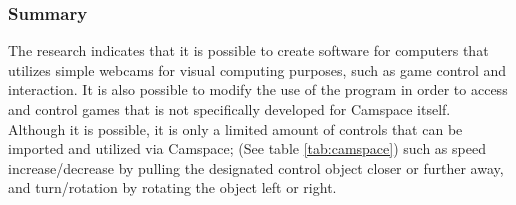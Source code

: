 \subsubsection*{Summary}
The research indicates that it is possible to create software for computers that utilizes simple webcams for visual computing purposes, such as game control and interaction. It is also possible to modify the use of the program in order to access and control games that is not specifically developed for Camspace itself. Although it is possible, it is only a limited amount of controls that can be imported and utilized via Camspace; (See table \ref{tab:camspace})  such as speed increase/decrease by pulling the designated control object closer or further away, and turn/rotation by rotating the object left or right.